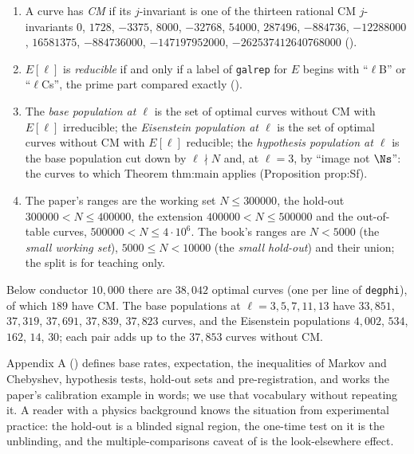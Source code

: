 \begin{sloppypar}
\begin{convention}\label{conv:computation:populations}
\begin{enumerate}[label=(\alph*)]
\item A curve has \emph{CM} if its $j$-invariant is one of the thirteen rational CM $j$-invariants $0$, $1728$, $-3375$, $8000$, $-32768$, $54000$,
$287496$, $-884736$, $-12288000$, $16581375$, $-884736000$, $-147197952000$, $-262537412640768000$ ().
\item $E[\ell]$ is \emph{reducible} if and only if a label of \texttt{galrep} for $E$ begins with ``$\ell$B'' or ``$\ell$Cs'', the prime part
compared exactly ().
\item The \emph{base population at $\ell$} is the set of optimal curves without CM with $E[\ell]$ irreducible; the \emph{Eisenstein population at
$\ell$} is the set of optimal curves without CM with $E[\ell]$ reducible; the \emph{hypothesis population at $\ell$} is the base population
cut down by $\ell\nmid N$ and, at $\ell=3$, by ``image not $\Ns$'': the curves to which Theorem thm:main applies (Proposition prop:Sf).
\item The paper's ranges are the working set $N\le300000$, the hold-out $300000<N\le400000$, the extension $400000<N\le500000$ and the
out-of-table curves, $500000<N\le4\cdot10^6$. The book's ranges are $N<5000$ (the \emph{small working set}), $5000\le N<10000$ (the
\emph{small hold-out}) and their union; the split is for teaching only.
\end{enumerate}
Below conductor $10{,}000$ there are $38{,}042$ optimal curves (one per line of \texttt{degphi}), of which $189$ have CM. The base populations at
$\ell=3,5,7,11,13$ have $33{,}851$, $37{,}319$, $37{,}691$, $37{,}839$, $37{,}823$ curves, and the Eisenstein populations $4{,}002$, $534$, $162$, $14$, $30$; each
pair adds up to the $37{,}853$ curves without CM.
\end{convention}

Appendix A () defines base rates, expectation, the inequalities of Markov and Chebyshev, hypothesis tests, hold-out sets and
pre-registration, and works the paper's calibration example in words; we use that vocabulary without repeating it. A reader with a
physics background knows the situation from experimental practice: the hold-out is a blinded signal region, the one-time test on it is the
unblinding, and the multiple-comparisons caveat of  is the look-elsewhere effect.


\end{sloppypar}
